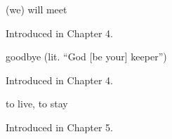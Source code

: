 \noindent\begin{minipage}[t]{\linewidth}
\raggedright
\textbf{}\par
\small (we) will meet\par
\footnotesize Introduced in Chapter 4.
\end{minipage}\par\medskip

\noindent\begin{minipage}[t]{\linewidth}
\raggedright
\textbf{ }\par
\small goodbye (lit. \textquotedblleft{}God {[}be your{]} keeper\textquotedblright{})\par
\footnotesize Introduced in Chapter 4.
\end{minipage}\par\medskip

\noindent\begin{minipage}[t]{\linewidth}
\raggedright
\textbf{}\par
\small to live, to stay\par
\footnotesize Introduced in Chapter 5.
\end{minipage}\par\medskip

